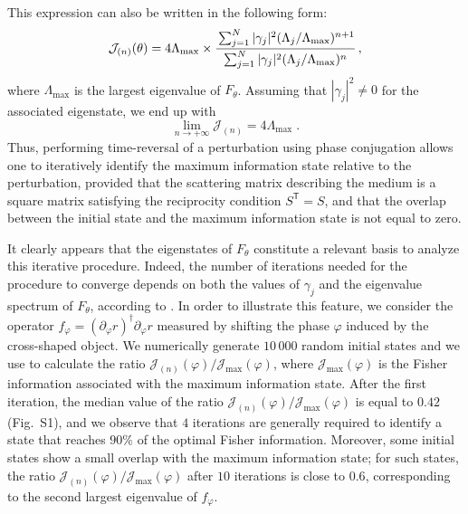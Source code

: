 \documentclass[aps,pra,twocolumn,amsmath,amssymb,superscriptaddress,10pt,nobibnotes]{revtex4-2}
\begin{document}
This expression can also be written in the following form:
\begin{equation}
\mathcal{J}_{(n)}(\theta)= 4 \Lambda_\mathrm{max} \times  \cfrac{\sum_{j=1}^N |\gamma_j|^2 (\Lambda_j/\Lambda_\mathrm{max})^{n+1}}{\sum_{j=1}^N |\gamma_j|^2 (\Lambda_j/\Lambda_\mathrm{max})^n} \; ,
\end{equation}
where $\Lambda_\mathrm{max}$ is the largest eigenvalue of $F_\theta$. Assuming that $|\gamma_j|^2\neq0$ for the associated eigenstate, we end up with
\begin{equation}
\lim_{n \to + \infty} \mathcal{J}_{(n)} = 4 \Lambda_\mathrm{max} \; .
\end{equation}
Thus, performing time-reversal of a perturbation using phase conjugation allows one to iteratively identify the maximum information state relative to the perturbation, provided that the scattering matrix describing the medium is a square matrix satisfying the reciprocity condition $S^\mathsf{T}=S$, and that the overlap between the initial state and the maximum information state is not equal to zero. 

It clearly appears that the eigenstates of $F_\theta$ constitute a relevant basis to analyze this iterative procedure. Indeed, the number of iterations needed for the procedure to converge depends on both the values of $\gamma_j$ and the eigenvalue spectrum of $F_\theta$, according to . In order to illustrate this feature, we consider the operator $f_\varphi=(\partial_\varphi r)^\dagger \partial_\varphi r $ measured by shifting the phase $\varphi$ induced by the cross-shaped object. We numerically generate $10\,000$ random initial states and we use  to calculate the ratio $\mathcal{J}_{(n)}(\varphi)/\mathcal{J}_\mathrm{max}(\varphi)$, where $\mathcal{J}_\mathrm{max}(\varphi)$ is the Fisher information associated with the maximum information state. After the first iteration, the median value of the ratio $\mathcal{J}_{(n)}(\varphi)/\mathcal{J}_\mathrm{max}(\varphi)$ is equal to $0.42$ (Fig.~S1), and we observe that $4$ iterations are generally required to identify a state that reaches $90\%$ of the optimal Fisher information. Moreover, some initial states show a small overlap with the maximum information state; for such states, the ratio $\mathcal{J}_{(n)}(\varphi)/\mathcal{J}_\mathrm{max}(\varphi)$ after $10$ iterations is close to $0.6$, corresponding to the second largest eigenvalue of $f_\varphi$.
\end{document}
